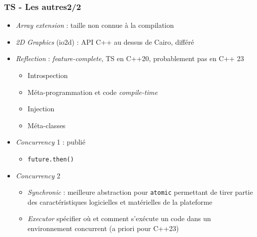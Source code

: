 \documentclass[C++.tex]{subfiles}
\begin{document}
\begin{frame}
	\frametitle{TS - Les autres\titlehfill{}2/2}
	\begin{itemize}
		\item \textit{Array extension} : taille non connue à la compilation
		\item \textit{2D Graphics} (io2d) : API C++ au dessus de Cairo, différé


		\item \textit{Reflection} : \textit{feature-complete}, TS en \og C++20\fg{}, probablement pas en C++ 23
		\begin{itemize}
			\item Introspection
			\item Méta-programmation et code \textit{compile-time}
			\item Injection
			\item Méta-classes
		\end{itemize}


		\item \textit{Concurrency} 1 : publié
		\begin{itemize}
			\item \lstinline|future.then()|
		\end{itemize}
		\item \textit{Concurrency} 2
		\begin{itemize}
			\item \textit{Synchronic} : meilleure abstraction pour \lstinline|atomic| permettant de tirer partie des caractéristiques logicielles et matérielles de la plateforme
			\item \textit{Executor} spécifier où et comment s'exécute un code dans un environnement concurrent (a priori pour C++23)
		\end{itemize}
	\end{itemize}
\end{frame}
\end{document}
